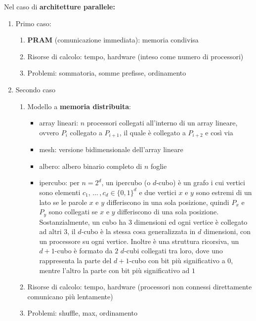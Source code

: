 \documentclass[11pt]{article}
\begin{document}
	\newpage
	
	Nel caso di \textbf{architetture parallele:}
	\begin{enumerate}[label*=\Alph*.]
		\item Primo caso:
		\begin{enumerate}[label=\arabic*. ]
			\item \textbf{PRAM} (comunicazione immediata): memoria condivisa
			\item Risorse di calcolo: tempo, hardware (inteso come numero di processori)
			\item Problemi: sommatoria, somme prefisse, ordinamento
		\end{enumerate}
		\item Secondo caso
		\begin{enumerate}[label=\arabic*. ]
			\item Modello a \textbf{memoria distribuita}:
			\begin{itemize}
				\item array lineari: $n$ processori collegati all'interno di un array lineare, ovvero $P_i$ collegato a $P_{i+1}$, il quale è collegato a $P_{i+2}$ e così via
				\item mesh: versione bidimensionale dell'array lineare
				\item albero: albero binario completo di $n$ foglie
				\item ipercubo: per $n = 2^d$, un ipercubo (o $d$-cubo) è un grafo i cui vertici sono elementi $c_1, \, ... \, , c_d \in \{0,1\}^d$ e due vertici $x$ e $y$ sono estremi di un lato se le parole $x$ e $y$ differiscono in una sola posizione, quindi $P_x$ e $P_y$ sono collegati se $x$ e $y$ differiscono di una sola posizione. Sostanzialmente, un cubo ha $3$ dimensioni ed ogni vertice è collegato ad altri $3$, il $d$-cubo è la stessa cosa generalizzata in $d$ dimensioni, con un processore su ogni vertice. Inoltre è una struttura ricorsiva, un $d+1$-cubo è formato da $2$ $d$-cubi collegati tra loro, dove uno rappresenta la parte del $d+1$-cubo con bit più significativo a $0$, mentre l'altro la parte con bit più significativo ad $1$
			\end{itemize}
			\item Risorse di calcolo: tempo, hardware (processori non connessi direttamente comunicano più lentamente)
			\item Problemi: shuffle, max, ordinamento
		\end{enumerate}
	\end{enumerate}
	
\end{document}
